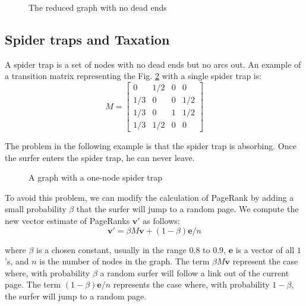 \begin{figure}[H]
\centering
\scalebox{1}{
    
}
\caption{The reduced graph with no dead ends}
\label{fig:graph-reduced-no-dead-ends}
\end{figure}

\subsection{Spider traps and Taxation}\label{subsec:spider-traps-taxation}

A spider trap is a set of nodes with no dead ends but no arcs out. An example of a transition matrix representing the Fig. \ref{fig:graph-spider-trap} with a single spider trap is:
\begin{equation*}
    M = 
    \begin{bmatrix}
        0 & 1/2 & 0 & 0 \\
        1/3 & 0 & 0 & 1/2 \\
        1/3 & 0 & 1 & 1/2 \\
        1/3 & 1/2 & 0 & 0
    \end{bmatrix}
\end{equation*}

The problem in the following example is that the spider trap is absorbing. Once the surfer enters the spider trap, he can never leave.

\begin{figure}[H]
\centering
\scalebox{1}{
    
}
\caption{A graph with a one-node spider trap}
\label{fig:graph-spider-trap}
\end{figure}

To avoid this problem, we can modify the calculation of PageRank by adding a small probability $\beta$ that the surfer will jump to a random page. We compute the new vector estimate of PageRanks $\textbf{v}'$ as follows: 
\begin{equation}\label{eq:taxation}
    \textbf{v}' = \beta M \textbf{v} + (1 - \beta) \textbf{e} / n
\end{equation}

where $\beta$ is a chosen constant, usually in the range $0.8$ to $0.9$, $\textbf{e}$ is a vector of all $1$'s, and $n$ is the number of nodes in the graph. The term $\beta M \textbf{v}$ represent the case where, with probability $\beta$ a random surfer will follow a link out of the current page. The term $(1 - \beta) \textbf{e} / n$ represents the case where, with probability $1 - \beta$, the surfer will jump to a random page.

